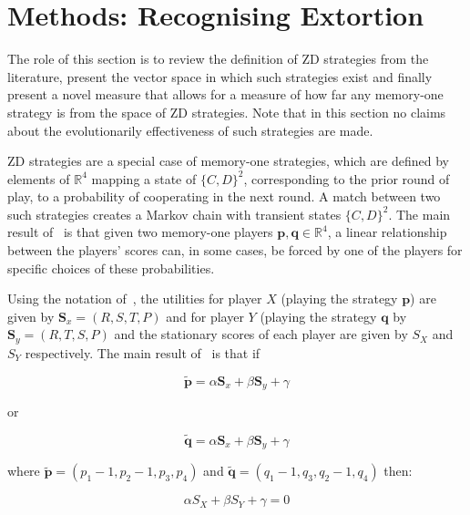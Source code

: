 \documentclass[a4paper]{article}
\begin{document}
\section{Methods: Recognising Extortion}\label{sec:sserror-zd-strategies}

The role of this section is to review the definition of ZD
strategies from the literature, present the vector space in which such
strategies exist and finally present a novel measure that allows for a measure
of how far any memory-one strategy is from the space of ZD
strategies. Note that in this section no claims about the evolutionarily
effectiveness of such strategies are made.

ZD strategies are a special case of memory-one strategies,
which are defined by elements of \(\mathbb{R}^4\) mapping a state of
\({\{C, D\}}^2\), corresponding to the prior round of play, to a probability of
cooperating in the next round. A match between two such strategies creates a
Markov chain with transient states \({\{C, D\}}^2\). The main result
of~\cite{Press2012} is that given two memory-one players \(\textbf{p},
\textbf{q}\in\mathbb{R}^4\), a linear relationship between the players' scores can, in
some cases, be forced by one of the players for specific choices of these
probabilities.

Using the notation of~\cite{Press2012}, the utilities for player \(X\) (playing
the strategy \(\textbf{p}\))
are given by \(\textbf{S}_x=(R, S, T, P)\) and for player \(Y\) (playing the
strategy \(\textbf{q}\) by \(\textbf{S}_y=(R, T, S, P)\)
and the stationary scores of each player are given by \(S_X\) and \(S_Y\)
respectively. The main result of~\cite{Press2012} is that if

\begin{equation}\label{eqn:linear_relationship_for_p}
    \tilde{\textbf{p}}=\alpha \textbf{S}_x + \beta \textbf{S}_y + \gamma
\end{equation}

or

\begin{equation}\label{eqn:linear_relationship_for_q}
    \tilde{\textbf{q}}=\alpha \textbf{S}_x + \beta \textbf{S}_y + \gamma
\end{equation}

where \(\tilde{\textbf{p}} = (p_1 - 1, p_2 - 1, p_3, p_4)\) and
\(\tilde{\textbf{q}} = (q_1 - 1, q_3, q_2 - 1, q_4)\) then:

\begin{equation}
    \alpha S_X + \beta S_Y + \gamma = 0
\end{equation}
\end{document}
